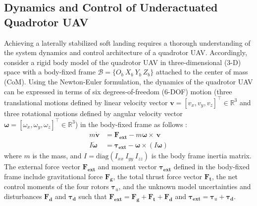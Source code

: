 \documentclass{IEEEtaes}
\begin{document}
\subsection{Dynamics and Control of Underactuated Quadrotor UAV} \label{quadrotor dynamics: section}
Achieving a laterally stabilized soft landing requires a thorough understanding of the system dynamics and control architecture of a quadrotor UAV. Accordingly, consider a rigid body model of the quadrotor UAV in three-dimensional (3-D) space with a body-fixed frame $\mathcal{B} = \{O_b~X_b~Y_b~Z_b\}$ attached to the center of mass (CoM). Using the Newton-Euler formulation, the dynamics of the quadrotor UAV can be expressed in terms of six degrees-of-freedom (6-DOF) motion (three translational motions defined by linear velocity vector $\boldsymbol{v} = [v_x, v_y, v_z]^\top \in \mathbb{R}^3$ and three rotational motions defined by angular velocity vector $\boldsymbol{\omega} = [\omega_x, \omega_y, \omega_z]^\top \in \mathbb{R}^3$) in the body-fixed frame as follows \cite{poultney2018}:
\begin{align}
\label{quadrotor dynamics: equation}
    m \dot{\boldsymbol{v}} &= \boldsymbol{F_{\text{ext}}} - m \boldsymbol{\omega} \times ~\boldsymbol{v}  \nonumber \\
    I \dot{\boldsymbol{\omega}} &= \boldsymbol{\tau_{\text{ext}}} - \boldsymbol{\omega} \times (I \boldsymbol{\omega})
\end{align}
where $m$ is the mass,  and $I = \text{diag}(I_{xx}~I_{yy}~I_{zz})$ is the body frame inertia matrix. The external force vector $\boldsymbol{F_{\text{ext}}}$ and moment vector $\boldsymbol{\tau_{\text{ext}}}$ defined in the body-fixed frame include gravitational force $\boldsymbol{F_{\text{g}}}$, the total thrust force vector $\boldsymbol{F_{\text{t}}}$, the net control moments of the four rotors $\boldsymbol{\tau}_u$, and the unknown model uncertainties and disturbances $\boldsymbol{F_{\text{d}}}$ and $\boldsymbol{\tau_{\text{d}}}$ such that
$\boldsymbol{F_{\text{ext}}} = \boldsymbol{F_{\text{g}}} + \boldsymbol{F_{\text{t}}} + \boldsymbol{F_{\text{d}}}$ and $\boldsymbol{\tau_{\text{ext}}} = \boldsymbol{\tau}_u + \boldsymbol{\tau_{\text{d}}}$.
\end{document}
